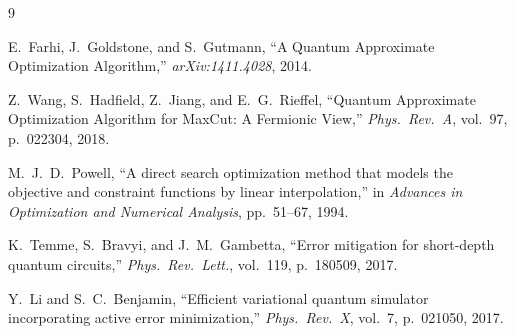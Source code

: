 \documentclass[11pt,a4paper]{article}
\begin{document}
\begin{thebibliography}{9}

  E.~Farhi, J.~Goldstone, and S.~Gutmann,
  ``A Quantum Approximate Optimization Algorithm,''
  \emph{arXiv:1411.4028}, 2014.

  Z.~Wang, S.~Hadfield, Z.~Jiang, and E.~G.~Rieffel,
  ``Quantum Approximate Optimization Algorithm for MaxCut: A Fermionic View,''
  \emph{Phys.\ Rev.\ A}, vol.~97, p.~022304, 2018.

  M.~J.~D.~Powell,
  ``A direct search optimization method that models the objective and
  constraint functions by linear interpolation,''
  in \emph{Advances in Optimization and Numerical Analysis}, pp.~51--67, 1994.

  K.~Temme, S.~Bravyi, and J.~M.~Gambetta,
  ``Error mitigation for short-depth quantum circuits,''
  \emph{Phys.\ Rev.\ Lett.}, vol.~119, p.~180509, 2017.

  Y.~Li and S.~C.~Benjamin,
  ``Efficient variational quantum simulator incorporating active error
  minimization,''
  \emph{Phys.\ Rev.\ X}, vol.~7, p.~021050, 2017.

\end{thebibliography}
\end{document}
